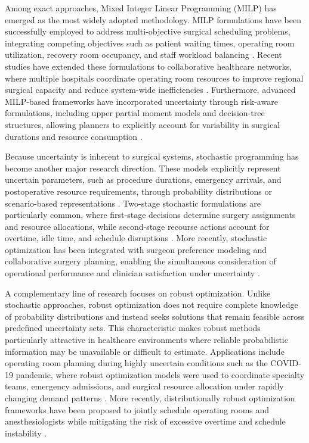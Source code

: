 \documentclass[sn-mathphys-num]{sn-jnl}
\begin{document}
    Among exact approaches, Mixed Integer Linear Programming (MILP) has emerged as the most widely adopted methodology. MILP formulations have been successfully employed to address multi-objective surgical scheduling problems, integrating competing objectives such as patient waiting times, operating room utilization, recovery room occupancy, and staff workload balancing \cite{cardoen2010_seq,jittamai2025}. Recent studies have extended these formulations to collaborative healthcare networks, where multiple hospitals coordinate operating room resources to improve regional surgical capacity and reduce system-wide inefficiencies \cite{roshanaei2017}. Furthermore, advanced MILP-based frameworks have incorporated uncertainty through risk-aware formulations, including upper partial moment models and decision-tree structures, allowing planners to explicitly account for variability in surgical durations and resource consumption \cite{maleki2023}.
    
    Because uncertainty is inherent to surgical systems, stochastic programming has become another major research direction. These models explicitly represent uncertain parameters, such as procedure durations, emergency arrivals, and postoperative resource requirements, through probability distributions or scenario-based representations \cite{lamiri2008,denton2011}. Two-stage stochastic formulations are particularly common, where first-stage decisions determine surgery assignments and resource allocations, while second-stage recourse actions account for overtime, idle time, and schedule disruptions \cite{denton2011,lalmazloumian2023}. More recently, stochastic optimization has been integrated with surgeon preference modeling and collaborative surgery planning, enabling the simultaneous consideration of operational performance and clinician satisfaction under uncertainty \cite{azab2024}.
    
    A complementary line of research focuses on robust optimization. Unlike stochastic approaches, robust optimization does not require complete knowledge of probability distributions and instead seeks solutions that remain feasible across predefined uncertainty sets. This characteristic makes robust methods particularly attractive in healthcare environments where reliable probabilistic information may be unavailable or difficult to estimate. Applications include operating room planning during highly uncertain conditions such as the COVID-19 pandemic, where robust optimization models were used to coordinate specialty teams, emergency admissions, and surgical resource allocation under rapidly changing demand patterns \cite{arabmomeni2022}. More recently, distributionally robust optimization frameworks have been proposed to jointly schedule operating rooms and anesthesiologists while mitigating the risk of excessive overtime and schedule instability \cite{tsang2025,fallahpour2024}.
    
\end{document}
